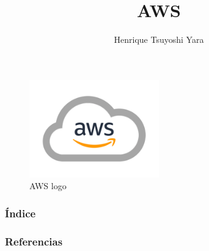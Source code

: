 \documentclass{beamer}
\title {AWS}
\author {Henrique Tsuyoshi Yara}
\institute {OPUS-software}
\begin{document}
\begin{frame}{\titlepage}
	\begin{figure}[htpb]
		\centering
		\includegraphics[width=0.5\textwidth]{aws-logo}
		\caption{AWS logo}
	\end{figure}
\end{frame}


\begin{frame}[allowframebreaks]
\frametitle{Índice}
  \tableofcontents
\end{frame}
















%

\begin{frame}[allowframebreaks]
\frametitle{Referencias}
\printbibliography
\end{frame}
\end{document}
